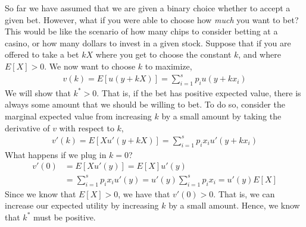 So far we have assumed that we are given a binary choice whether to accept a given bet. However, what if you were able to choose how \emph{much} you want to bet? This would be like the scenario of how many chips to consider betting at a casino, or how many dollars to invest in a given stock. Suppose that if you are offered to take a bet $kX$ where you get to choose the constant $k$, and where $E[X] > 0$. We now want to choose $k$ to maximize,
\begin{align*}
    v(k) = E[u(y + kX)] = \sum_{i = 1}^s p_i u(y + k x_i)
\end{align*}
We will show that $k^* > 0$. That is, if the bet has positive expected value, there is always some amount that we should be willing to bet. To do so, consider the marginal expected value from increasing $k$ by a small amount by taking the derivative of $v$ with respect to $k$,
\begin{align*}
    v'(k) = E[X u'(y + kX)] = \sum_{i = 1}^s p_i x_i u'(y + k x_i)
\end{align*}
What happens if we plug in $k = 0$?
\begin{align*}
    v'(0) &= E[X u'(y)] = E[X] u'(y) \\
    &= \sum_{i = 1}^s p_i x_i u'(y) = u'(y) \sum_{i = 1}^s p_i x_i  = u'(y) E[X]
\end{align*}
Since we know that $E[X] > 0$, we have that $v'(0) > 0$. That is, we can increase our expected utility by increasing $k$ by a small amount. Hence, we know that $k^*$ must be positive. 

